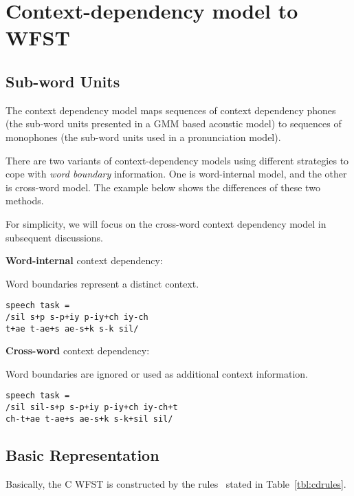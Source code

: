 \section{Context-dependency model to WFST}
\label{sec:cdmod}

\subsection{Sub-word Units}
\label{sec:subword}
The context dependency model maps sequences of context dependency phones (the sub-word units presented in a GMM based acoustic model) to sequences of monophones (the sub-word units used in a pronunciation model).

There are two variants of context-dependency models using different strategies to cope with \textit{word boundary} information. One is word-internal model, and the other is cross-word model. The example below shows the differences of these two methods. 

For simplicity, we will focus on the cross-word context dependency model in subsequent discussions. \vspace{5mm}

\textbf{Word-internal} context dependency:

Word boundaries represent a distinct context.
\begin{Verbatim}[frame=leftline, framesep=5mm]
speech task =
/sil s+p s-p+iy p-iy+ch iy-ch
t+ae t-ae+s ae-s+k s-k sil/
\end{Verbatim}

\textbf{Cross-word} context dependency:

Word boundaries are ignored or used as additional context information.
\begin{Verbatim}[frame=leftline, framesep=5mm]
speech task = 
/sil sil-s+p s-p+iy p-iy+ch iy-ch+t
ch-t+ae t-ae+s ae-s+k s-k+sil sil/
\end{Verbatim}

\subsection{Basic Representation} 
\label{cdrep}

Basically, the C WFST is constructed by the rules~\cite{dixonintroduction} stated in Table~\ref{tbl:cdrules}.
 
